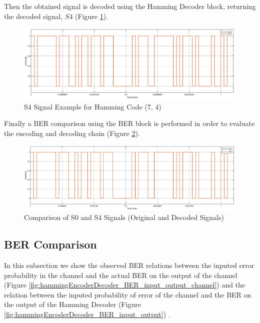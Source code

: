\begin{refsection}
Then the obtained signal is decoded using the Hamming Decoder block, returning the decoded signal, $S4$ (Figure \ref{fig:hammingEncoderDecoder_S4}).

\begin{figure}[h!]
	\centering
	\includegraphics[width=.9\linewidth]{./sdf/eit_25828_hamming_channel_encoder_decoder/images/S4.png}
	\vspace{-3mm}
	\caption{S4 Signal Example for Hamming Code (7, 4)}
	\label{fig:hammingEncoderDecoder_S4}
\end{figure}

Finally a BER comparison using the BER block is performed in order to evaluate the encoding and decoding chain (Figure \ref{fig:hammingEncoderDecoder_S0_S4}).

\begin{figure}[h!]
	\centering
	\includegraphics[width=.9\linewidth]{./sdf/eit_25828_hamming_channel_encoder_decoder/images/S0_S4.png}
	\vspace{-3mm}
	\caption{Comparison of S0 and S4 Signals (Original and Decoded Signals)}
	\label{fig:hammingEncoderDecoder_S0_S4}
	\vspace{-3mm}
\end{figure}

\vspace{-3mm}

\subsection*{BER Comparison}

\vspace{-1mm}

In this subsection we show the observed BER relations between the inputed error probability in the channel and the actual BER on the output of the channel (Figure \ref{fig:hammingEncoderDecoder_BER_input_output_channel}) and the relation between the inputed probability of error of the channel and the BER on the output of the Hamming Decoder (Figure \ref{fig:hammingEncoderDecoder_BER_input_output}) .


\end{refsection}

